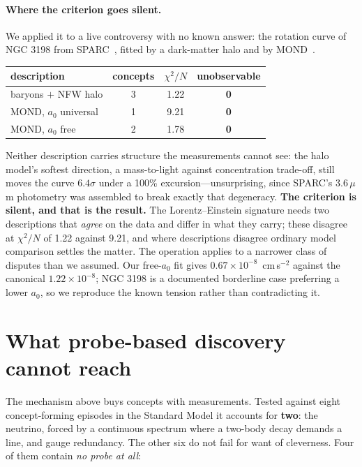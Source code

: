 \documentclass[aps,pra,twocolumn,superscriptaddress,nofootinbib,10pt]{revtex4-2}
\begin{document}
\paragraph{Where the criterion goes silent.} We applied it to a live controversy with no known
answer: the rotation curve of NGC 3198 from SPARC~\cite{lelli2016sparc}, fitted by a dark-matter
halo and by MOND~\cite{milgrom1983mond}.

\begin{center}
\begin{tabular}{lccc}
\toprule
description & concepts & $\chi^2/N$ & unobservable \\
\midrule
baryons $+$ NFW halo & 3 & 1.22 & \textbf{0} \\
MOND, $a_0$ universal & 1 & 9.21 & \textbf{0} \\
MOND, $a_0$ free & 2 & 1.78 & \textbf{0} \\
\bottomrule
\end{tabular}
\end{center}

Neither description carries structure the measurements cannot see: the halo model's softest
direction, a mass-to-light against concentration trade-off, still moves the curve $6.4\sigma$
under a 100\% excursion---unsurprising, since SPARC's $3.6\,\mu$m photometry was assembled to
break exactly that degeneracy. \textbf{The criterion is silent, and that is the result.} The
Lorentz--Einstein signature needs two descriptions that \emph{agree} on the data and differ in
what they carry; these disagree at $\chi^2/N$ of 1.22 against 9.21, and where descriptions
disagree ordinary model comparison settles the matter. The operation applies to a narrower class
of disputes than we assumed. Our free-$a_0$ fit gives $0.67{\times}10^{-8}$~cm\,s$^{-2}$ against
the canonical $1.22{\times}10^{-8}$; NGC 3198 is a documented borderline case preferring a lower
$a_0$, so we reproduce the known tension rather than contradicting it.

\section{What probe-based discovery cannot reach}
\label{sec:bound}

The mechanism above buys concepts with measurements. Tested against eight concept-forming
episodes in the Standard Model it accounts for \textbf{two}: the neutrino, forced by a continuous
spectrum where a two-body decay demands a line, and gauge redundancy. The other six do not fail
for want of cleverness. Four of them contain \emph{no probe at all}:
\end{document}
